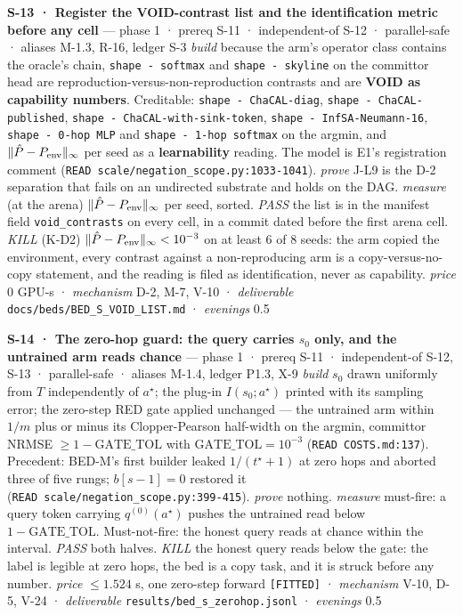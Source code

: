 \documentclass[11pt,a4paper]{article}
\theoremstyle{plain}
\theoremstyle{definition}
\theoremstyle{remark}
\begin{document}
\textbf{S-13 · Register the VOID-contrast list and the identification
metric before any cell} --- phase 1 · prereq S-11 · independent-of S-12
· parallel-safe · aliases M-1.3, R-16, ledger S-3 \emph{build} because
the arm's operator class contains the oracle's chain,
\texttt{shape\ -\ softmax} and \texttt{shape\ -\ skyline} on the
committor head are reproduction-versus-non-reproduction contrasts and
are \textbf{VOID as capability numbers}. Creditable:
\texttt{shape\ -\ ChaCAL-diag}, \texttt{shape\ -\ ChaCAL-published},
\texttt{shape\ -\ ChaCAL-with-sink-token},
\texttt{shape\ -\ InfSA-Neumann-16}, \texttt{shape\ -\ 0-hop\ MLP} and
\texttt{shape\ -\ 1-hop\ softmax} on the argmin, and
\(\|\hat P-P_{\rm env}\|_\infty\) per seed as a \textbf{learnability}
reading. The model is E1's registration comment
(\texttt{READ\ scale/negation\_scope.py:1033-1041}). \emph{prove} J-L9
is the D-2 separation that fails on an undirected substrate and holds on
the DAG. \emph{measure} (at the arena) \(\|\hat P-P_{\rm env}\|_\infty\)
per seed, sorted. \emph{PASS} the list is in the manifest field
\texttt{void\_contrasts} on every cell, in a commit dated before the
first arena cell. \emph{KILL} (K-D2)
\(\|\hat P-P_{\rm env}\|_\infty<10^{-3}\) on at least 6 of 8 seeds: the
arm copied the environment, every contrast against a non-reproducing arm
is a copy-versus-no-copy statement, and the reading is filed as
identification, never as capability. \emph{price} \(0\) GPU-s ·
\emph{mechanism} D-2, M-7, V-10 · \emph{deliverable}
\texttt{docs/beds/BED\_S\_VOID\_LIST.md} · \emph{evenings} 0.5

\textbf{S-14 · The zero-hop guard: the query carries \(s_0\) only, and
the untrained arm reads chance} --- phase 1 · prereq S-11 ·
independent-of S-12, S-13 · parallel-safe · aliases M-1.4, ledger P1.3,
X-9 \emph{build} \(s_0\) drawn uniformly from \(T\) independently of
\(a^\star\); the plug-in \(I(s_0;a^\star)\) printed with its sampling
error; the zero-step RED gate applied unchanged --- the untrained arm
within \(1/m\) plus or minus its Clopper-Pearson half-width on the
argmin, committor NRMSE \(\ge1-\mathrm{GATE\_TOL}\) with
\(\mathrm{GATE\_TOL}=10^{-3}\) (\texttt{READ\ COSTS.md:137}). Precedent:
BED-M's first builder leaked \(1/(t^\star+1)\) at zero hops and aborted
three of five rungs; \(b[s-1]=0\) restored it
(\texttt{READ\ scale/negation\_scope.py:399-415}). \emph{prove} nothing.
\emph{measure} must-fire: a query token carrying \(q^{(0)}(a^\star)\)
pushes the untrained read below \(1-\mathrm{GATE\_TOL}\). Must-not-fire:
the honest query reads at chance within the interval. \emph{PASS} both
halves. \emph{KILL} the honest query reads below the gate: the label is
legible at zero hops, the bed is a copy task, and it is struck before
any number. \emph{price} \(\le1.524\) s, one zero-step forward
\texttt{{[}FITTED{]}} · \emph{mechanism} V-10, D-5, V-24 ·
\emph{deliverable} \texttt{results/bed\_s\_zerohop.jsonl} ·
\emph{evenings} 0.5
\end{document}
